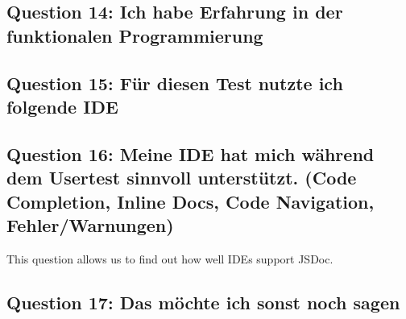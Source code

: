 \subsection{Question 14: Ich habe Erfahrung in der funktionalen Programmierung }
\label{sub:ut_q14}
\subsection{Question 15: Für diesen Test nutzte ich folgende IDE}
\label{sub:ut_q15}
\subsection{Question 16: Meine IDE hat mich während dem Usertest sinnvoll unterstützt. (Code Completion, Inline Docs, Code Navigation,  Fehler/Warnungen)}
This question allows us to find out how well IDEs support JSDoc.
\label{sub:ut_q16}
\subsection{Question 17: Das möchte ich sonst noch sagen}
\label{sub:ut_q17}
